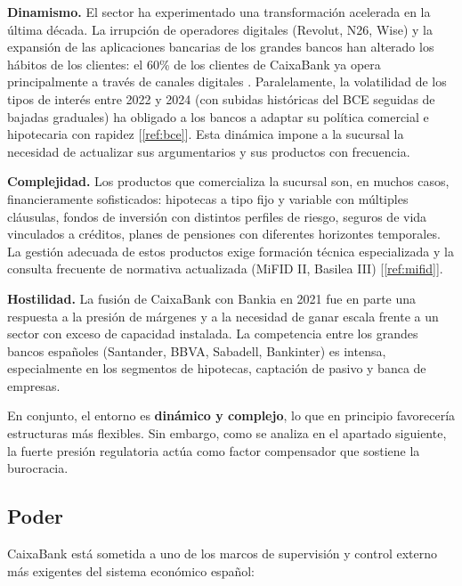 \textbf{Dinamismo.} El sector ha experimentado una transformación acelerada en la última
década. La irrupción de operadores digitales (Revolut, N26, Wise) y la expansión de las
aplicaciones bancarias de los grandes bancos han alterado los hábitos de los clientes:
el 60\% de los clientes de CaixaBank ya opera principalmente a través de canales digitales
. Paralelamente, la volatilidad de los tipos de interés entre 2022 y
2024 (con subidas históricas del BCE seguidas de bajadas graduales) ha obligado a los bancos
a adaptar su política comercial e hipotecaria con rapidez [\ref{ref:bce}]. Esta dinámica
impone a la sucursal la necesidad de actualizar sus argumentarios y sus productos con
frecuencia.

\textbf{Complejidad.} Los productos que comercializa la sucursal son, en muchos casos,
financieramente sofisticados: hipotecas a tipo fijo y variable con múltiples cláusulas,
fondos de inversión con distintos perfiles de riesgo, seguros de vida vinculados a créditos,
planes de pensiones con diferentes horizontes temporales. La gestión adecuada de estos
productos exige formación técnica especializada y la consulta frecuente de normativa
actualizada (MiFID II, Basilea III) [\ref{ref:mifid}].

\textbf{Hostilidad.} La fusión de CaixaBank con Bankia en 2021 fue en parte una respuesta
a la presión de márgenes y a la necesidad de ganar escala frente a un sector con exceso
de capacidad instalada. La competencia entre los grandes bancos españoles (Santander,
BBVA, Sabadell, Bankinter) es intensa, especialmente en los segmentos de hipotecas,
captación de pasivo y banca de empresas.

En conjunto, el entorno es \textbf{dinámico y complejo}, lo que en principio favorecería
estructuras más flexibles. Sin embargo, como se analiza en el apartado siguiente, la
fuerte presión regulatoria actúa como factor compensador que sostiene la burocracia.

\subsection{Poder}

CaixaBank está sometida a uno de los marcos de supervisión y control externo más
exigentes del sistema económico español:

